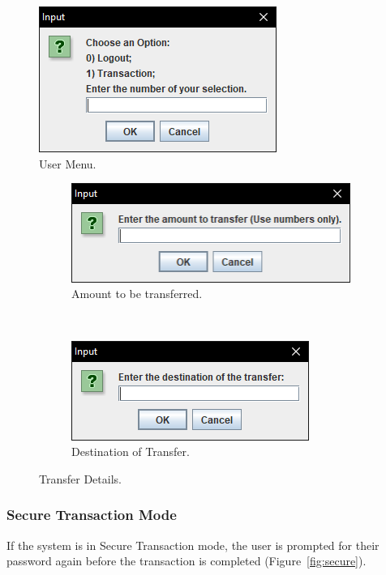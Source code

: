 \documentclass[12pt,twocolumn]{IEEEtran}
\begin{document}
\begin{figure}[h!]
	\centering
	\includegraphics[width=0.4\linewidth]{./Resources/userMenu.PNG}
	\caption{User Menu.} \label{fig:menu}
\end{figure}

\begin{figure}[h!]
	\centering
	\begin{subfigure}[t]{0.5\textwidth}
		\centering
		\includegraphics[width=0.8\linewidth]{./Resources/amount.PNG}
		\caption{Amount to be transferred.}
	\end{subfigure}%
	~ 
	\begin{subfigure}[t]{0.5\textwidth}
		\centering
		\includegraphics[width=0.8\linewidth]{./Resources/destination.PNG}
		\caption{Destination of Transfer.}
	\end{subfigure}
	\caption{Transfer Details.} \label{fig:transfer}
\end{figure}

\subsubsection{Secure Transaction Mode}

If the system is in Secure Transaction mode, the user is prompted for their password again before the transaction is completed (Figure~\ref{fig:secure}).
\end{document}
